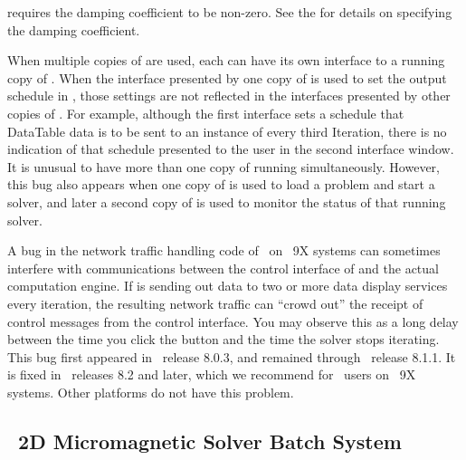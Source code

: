  requires the damping coefficient to be non-zero.
See the  for details on specifying the damping
coefficient.

When multiple copies of
are used, each can have its own interface to a running copy of
.  When the interface presented by one copy of
 is used to set the output schedule in ,
those settings are not reflected in the interfaces presented by other
copies of .  For example, although the first interface
sets a schedule that DataTable data is to be sent to an instance of
 every third Iteration, there is
no indication of that schedule presented to the user in the second
interface window.  It is unusual to have more than one copy of
 running simultaneously. However, this bug also appears
when one copy of  is used to load a problem and start a
solver, and later a second copy of  is used to monitor the
status of that running solver.

A bug in the network traffic handling code of
\Tcl\ on \Windows~9X systems can sometimes interfere
with communications between the control interface of  and
the actual computation engine.  If  is sending out data
to two or more data display services every iteration, the resulting
network traffic can ``crowd out'' the receipt of control messages from
the control interface.  You may observe this as a long delay between the
time you click the  button and the time the solver stops
iterating.  This bug first appeared in \Tcl\ release 8.0.3, and remained
through \Tcl\ release 8.1.1.  It is fixed in
\Tcl\ releases 8.2 and later, which we recommend for \OOMMF\ users on
\Windows~9X systems.  Other platforms do not have this problem.

\subsection{\OOMMF\ 2D Micromagnetic Solver Batch System}\label{sec:obs}

